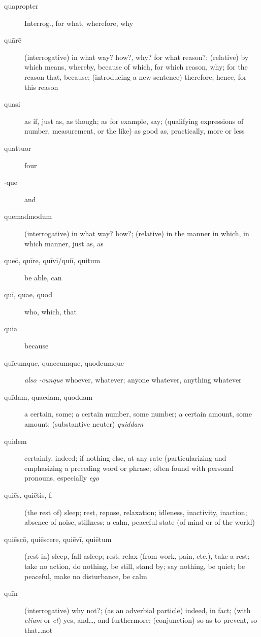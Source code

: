 \begin{description}
    \item[quapropter] Interrog., for what, wherefore, why
    \item[quārē] \marginnote{*}(interrogative) in what way? how?, why? for what reason?; (relative) by which means, whereby, because of which, for which reason, why; for the reason that, because; (introducing a new sentence) therefore, hence, for this reason
    \item[quasi] \marginnote{*}as if, just as, as though; as for example, say; (qualifying expressions of number, measurement, or the like) as good as, practically, more or less
    \item[quattuor] \marginnote{*}four
    \item[-que] \marginnote{*}and
    \item[quemadmodum] \marginnote{*}(interrogative) in what way? how?; (relative) in the manner in which, in which manner, just as, as
    \item[queō, quīre, quīvī/quiī, quitum] be able, can
    \item[quī, quae, quod] \marginnote{*}who, which, that
    \item[quia] \marginnote{*}because
    \item[quīcumque, quaecumque, quodcumque] \marginnote{*}\textit{also -cunque} whoever, whatever; anyone whatever, anything whatever
    \item[quīdam, quaedam, quoddam] a certain, some; a certain number, some number; a certain amount, some amount; (substantive neuter) \textit{quiddam}
    \item[quidem] \marginnote{*}certainly, indeed; if nothing else, at any rate (particularizing and emphasizing a preceding word or phrase; often found with personal pronouns, especially \textit{ego}
    \item[quiēs, quiētis, f.] (the rest of) sleep; rest, repose, relaxation; idleness, inactivity, inaction; absence of noise, stillness; a calm, peaceful state (of mind or of the world)
    \item[quiēscō, quiēscere, quiēvī, quiētum] \marginnote{*}(rest in) sleep, fall asleep; rest, relax (from work, pain, etc.), take a rest; take no action, do nothing, be still, stand by; say nothing, be quiet; be peaceful, make no disturbance, be calm
    \item[quīn] \marginnote{*}(interrogative) why not?; (as an adverbial particle) indeed, in fact; (with \textit{etiam} or \textit{et}) yes, and\dots, and furthermore; (conjunction) so as to prevent, so that\dots not

\end{description}
